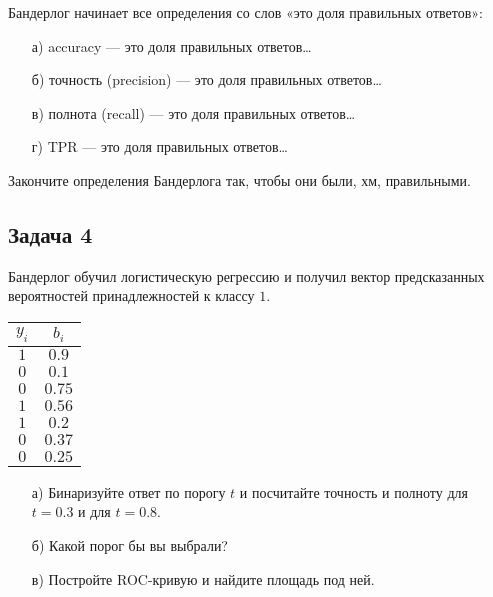 \documentclass[12pt, a4paper, oneside]{article}
\begin{document}
Бандерлог начинает все определения со слов «это доля правильных ответов»:
\begin{enumerate}
	\item[а)] accuracy — это доля правильных ответов\ldots
	\item[б)] точность (precision) — это доля правильных ответов\ldots
	\item[в)] полнота (recall) — это доля правильных ответов\ldots
	\item[г)] TPR — это доля правильных ответов\ldots
\end{enumerate}

Закончите определения Бандерлога так, чтобы они были, хм, правильными.



\subsection*{Задача 4}

Бандерлог обучил логистическую регрессию и получил вектор предсказанных вероятностей принадлежностей к классу $1$. 

\begin{center}
	\begin{tabular}{c|c}
		$y_i$ & $b_i$ \\
		\hline
		$1$  & $0.9$ \\
		$0$ & $0.1$ \\
		$0$ & $0.75$ \\
		$1$ & $0.56$ \\
		$1$ & $0.2$ \\
		$0$ & $0.37$ \\
		$0$ & $0.25$ \\		
	\end{tabular}
\end{center}

\begin{enumerate}
	\item[а)]  Бинаризуйте ответ по порогу $t$ и посчитайте точность и полноту для $t = 0.3$ и для  $t = 0.8$.
	\item[б)]  Какой порог бы вы выбрали? 
	\item[в)]  Постройте ROC-кривую и найдите площадь под ней. 
\end{enumerate}


\end{document}
